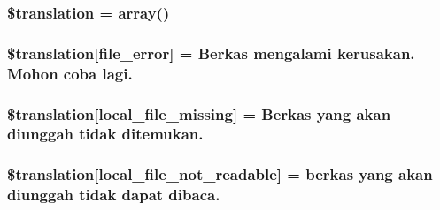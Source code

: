 \subsubsection[{\$translation}]{\setlength{\rightskip}{0pt plus 5cm}\$translation = array()}\label{class_8upload_8id___i_d_8php_a1f198d410fecc3871ebdd468d343a5e3}
\hypertarget{class_8upload_8id___i_d_8php_ac7498e49b9771b04698029aa61c70821}{}
\subsubsection[{\$translation}]{\setlength{\rightskip}{0pt plus 5cm}\$translation\mbox{[}\textquotesingle{}file\+\_\+error\textquotesingle{}\mbox{]} = \textquotesingle{}Berkas mengalami kerusakan. Mohon coba lagi.\textquotesingle{}}\label{class_8upload_8id___i_d_8php_ac7498e49b9771b04698029aa61c70821}
\hypertarget{class_8upload_8id___i_d_8php_a6ec3d3a47ab70d77e7aa593e82ead10e}{}
\subsubsection[{\$translation}]{\setlength{\rightskip}{0pt plus 5cm}\$translation\mbox{[}\textquotesingle{}local\+\_\+file\+\_\+missing\textquotesingle{}\mbox{]} = \textquotesingle{}Berkas yang akan diunggah tidak ditemukan.\textquotesingle{}}\label{class_8upload_8id___i_d_8php_a6ec3d3a47ab70d77e7aa593e82ead10e}
\hypertarget{class_8upload_8id___i_d_8php_a60104befef9b241f3a7a6a755618a4b3}{}
\subsubsection[{\$translation}]{\setlength{\rightskip}{0pt plus 5cm}\$translation\mbox{[}\textquotesingle{}local\+\_\+file\+\_\+not\+\_\+readable\textquotesingle{}\mbox{]} = \textquotesingle{}berkas yang akan diunggah tidak dapat dibaca.\textquotesingle{}}\label{class_8upload_8id___i_d_8php_a60104befef9b241f3a7a6a755618a4b3}
\hypertarget{class_8upload_8id___i_d_8php_a6a08dcd0d3651fdd098568f6b2f0a42c}{}
